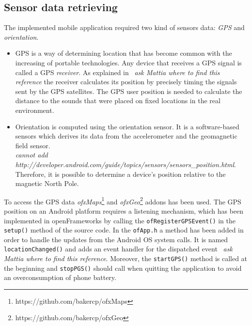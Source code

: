 \documentclass[journal]{IEEEtran}
\begin{document}
\subsection{Sensor data retrieving}
The implemented mobile application required two kind of sensors data: \emph{GPS} and \emph{orientation}. 
\begin{itemize}  
\item GPS is a way of determining location that has become common with the increasing of portable technologies. Any device that receives a GPS signal is 	called a GPS \emph{receiver}. As explained in~\cite{} {\footnotesize{\textit{ask Mattia where to find this reference}}} the receiver calculates its position by precisely timing the signals sent by the GPS satellites.
The GPS user position is needed to calculate the distance to the sounds that were placed on fixed locations in the real environment. 
\item Orientation is computed using the orientation sensor. It is a software-based sensors which derives its data from the accelerometer and the geomagnetic field sensor.
\\
{\footnotesize{\textit{cannot add \\ http://developer.android.com/guide/topics/sensors/sensors\_position.html}}}. 
\\
Therefore, it is possible to determine a device's position relative to the magnetic North Pole.
\end{itemize}

To access the GPS data \emph{ofxMaps}\footnote{https://github.com/bakercp/ofxMaps} and \emph{ofxGeo}\footnote{https://github.com/bakercp/ofxGeo} addons has been used. The GPS position on an Android platform requires a listening mechanism, which has been implemented in openFrameworks by calling the \texttt{ofRegisterGPSEvent()} in the \texttt{setup()} method of the source code. In the \texttt{ofApp.h} a method has been added in order to handle the updates from the Android OS system calls. It is named \texttt{locationChanged()} and adds an event handler for the dispatched event~\cite{} {\footnotesize{\textit{ask Mattia where to find this reference}}}. Moreover, the \texttt{startGPS()} method is called at the beginning and \texttt{stopPGS()} should call when quitting the application to avoid an overconsumption of phone battery. 

\end{document}

